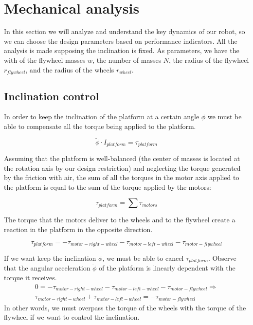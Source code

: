 \section{Mechanical analysis} \label{sec: mechanical analysis}
In this section we will analyze and understand the key dynamics of our robot, so we can choose
the design parameters based on performance indicators. All the analysis is made
supposing the inclination is fixed. As parameters, we have the with of the
flywheel masses $w$, the number of masses $N$, the radius of the flywheel $r_{flywheel}$, and
the radius of the wheels $r_{wheel}$.

\subsection{Inclination control}
In order to keep the inclination of the platform at a certain angle $\phi$ 
we must be able to compensate all the torque being applied to the platform.

\[\ddot{\phi}\cdot I_{platform} = \tau_{platform} \]

Assuming that the platform is well-balanced (the center of masses is located
at the rotation axis by our design restriction) and neglecting the torque generated
by the friction
with air, the sum of all the torques in the motor axis applied to the platform
is equal to the sum of the torque applied by the motors:

\[\tau_{platform} = \sum \tau_{motors}\]

The torque that the motors deliver to the wheels and to the flywheel create
a reaction in the platform in the opposite direction.

\[\tau_{platform} = -\tau_{motor-right-wheel} -\tau_{motor-left-wheel} -\tau_{motor-flywheel} \]

If we want keep the inclination $\phi$, we must be able to cancel $\tau_{platform}$.
Observe that the angular acceleration $\ddot{\phi}$ of the platform is linearly 
dependent with the torque it receives. 
\begin{equation} \label{eq:control equation}
\begin{split}
0 = -\tau_{motor-right-wheel} -\tau_{motor-left-wheel} -\tau_{motor-flywheel} \Rightarrow \\
\tau_{motor-right-wheel} +\tau_{motor-left-wheel} = -\tau_{motor-flywheel}
\end{split}
\end{equation}
In other words, we must overpass the torque of the wheels with the torque of the flywheel
if we want to control the inclination.


